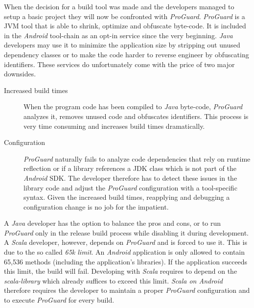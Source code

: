 \begin{description}
	When the decision for a build tool was made and the developers managed to setup a basic project they will now be confronted with \textit{ProGuard}. \textit{ProGuard} is a \ac{JVM} tool that is able to shrink, optimize and obfuscate byte-code. It is included in the \textit{Android} tool-chain as an opt-in service since the very beginning. \textit{Java} developers may use it to minimize the application size by stripping out unused dependency classes or to make the code harder to reverse engineer by obfuscating identifiers. These services do unfortunately come with the price of two major downsides.

	\begin{description}

		\item[Increased build times]\hfill

		When the program code has been compiled to \textit{Java} byte-code, \textit{ProGuard} analyzes it, removes unused code and obfuscates identifiers. This process is very time consuming and increases build times dramatically.

		\item[Configuration]\hfill

		\textit{ProGuard} naturally fails to analyze code dependencies that rely on runtime reflection or if a library references a \ac{JDK} class which is not part of the \textit{Android} \ac{SDK}. The developer therefore has to detect these issues in the library code and adjust the \textit{ProGuard} configuration with a tool-specific syntax. Given the increased build times, reapplying and debugging a configuration change is no job for the impatient.

	\end{description}

	A \textit{Java} developer has the option to balance the pros and cons, or to run \textit{ProGuard} only in the release build process while disabling it during development. A \textit{Scala} developer, however, depends on \textit{ProGuard} and is forced to use it. This is due to the so called \textit{65k limit}. An \textit{Android} application is only allowed to contain 65,536 methods (including the application's libraries). If the application succeeds this limit, the build will fail. Developing with \textit{Scala} requires to depend on the \textit{scala-library} which already suffices to exceed this limit. \textit{Scala on Android} therefore requires the developer to maintain a proper \textit{ProGuard} configuration and to execute \textit{ProGuard} for every build.


\end{description}
